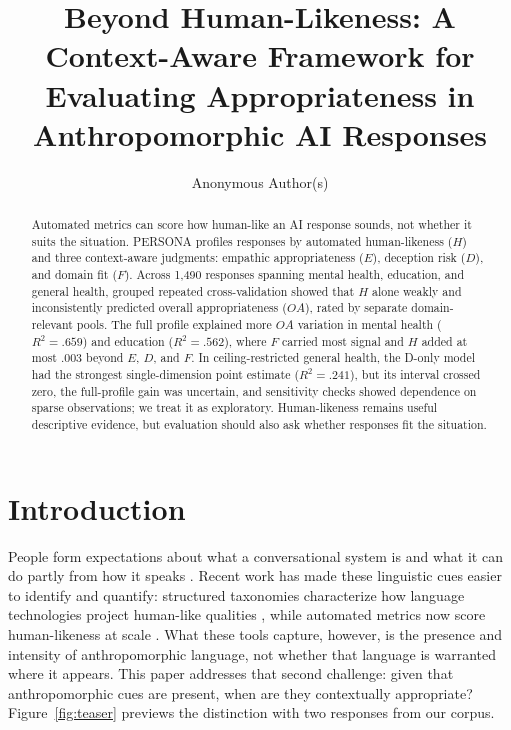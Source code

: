 \documentclass[manuscript,review,anonymous]{acmart}
\title[Beyond Human-Likeness]{Beyond Human-Likeness: A Context-Aware Framework for Evaluating Appropriateness in Anthropomorphic AI Responses}
\author{Anonymous Author(s)}
\affiliation{%
  \institution{Anonymous Institution}
  \country{}}
\begin{document}
\begin{abstract}
Automated metrics can score how human-like an AI response sounds, not whether it suits the situation. PERSONA profiles responses by automated human-likeness ($H$) and three context-aware judgments: empathic appropriateness ($E$), deception risk ($D$), and domain fit ($F$). Across 1,490 responses spanning mental health, education, and general health, grouped repeated cross-validation showed that $H$ alone weakly and inconsistently predicted overall appropriateness ($OA$), rated by separate domain-relevant pools. The full profile explained more $OA$ variation in mental health ($R^2=.659$) and education ($R^2=.562$), where $F$ carried most signal and $H$ added at most .003 beyond $E$, $D$, and $F$. In ceiling-restricted general health, the D-only model had the strongest single-dimension point estimate ($R^2=.241$), but its interval crossed zero, the full-profile gain was uncertain, and sensitivity checks showed dependence on sparse observations; we treat it as exploratory. Human-likeness remains useful descriptive evidence, but evaluation should also ask whether responses fit the situation.
\end{abstract}



\maketitle

\section{Introduction}

People form expectations about what a conversational system is and what it can do partly from how it speaks \cite{nass2000, reeves1996}. Recent work has made these linguistic cues easier to identify and quantify: structured taxonomies characterize how language technologies project human-like qualities \cite{abercrombie2023, devrio2025}, while automated metrics now score human-likeness at scale \cite{cheng2025}. What these tools capture, however, is the presence and intensity of anthropomorphic language, not whether that language is warranted where it appears. This paper addresses that second challenge: given that anthropomorphic cues are present, when are they contextually appropriate? Figure~\ref{fig:teaser} previews the distinction with two responses from our corpus.
\end{document}
